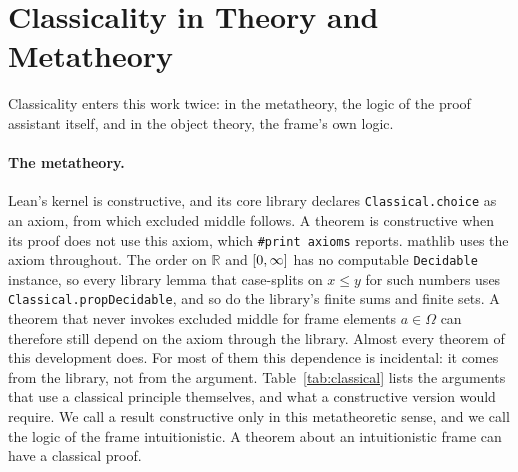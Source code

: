 \section{Classicality in Theory and Metatheory}
\label{sec:hinge}

Classicality enters this work twice: in the metatheory, the logic
of the proof assistant itself, and in the object theory, the frame's
own logic.

\paragraph{The metatheory.}
Lean's kernel is constructive, and its core library declares
\texttt{Classical.choice} as an axiom, from which excluded middle
follows. A theorem is constructive when its proof does not use this
axiom, which \texttt{\#print axioms} reports. \textsf{mathlib} uses the
axiom throughout. The order on $\mathbb{R}$ and $[0,\infty]$ has no
computable \texttt{Decidable} instance, so every library lemma that
case-splits on $x \le y$ for such numbers uses
\texttt{Classical.propDecidable}, and so do the library's finite sums
and finite sets. A theorem that never invokes excluded middle for frame
elements $a \in \Omega$ can therefore still depend on the axiom through
the library. Almost every theorem of this development does. For most of
them this dependence is incidental: it comes from the library, not from
the argument. Table~\ref{tab:classical} lists the arguments that use a
classical principle themselves, and what a constructive version would
require. We call a result constructive only in this metatheoretic sense,
and we call the logic of the frame intuitionistic. A theorem about an
intuitionistic frame can have a classical proof.

